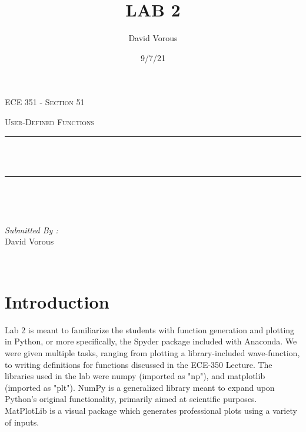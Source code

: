 \documentclass[12pt]{report}
\title{LAB 2}
\author{ David Vorous}
\date{9/7/21}
\makeatletter
\let\thetitle\@title
\makeatother
\begin{document}
\begin{titlepage}
	\centering
    \vspace*{0.5 cm}
\begin{center}    \textsc{\Large   ECE 351 - Section 51 }\\[2.0 cm]	\end{center}
	\textsc{\Large User-Defined Functions  }\\[0.5 cm]
	\rule{\linewidth}{0.2 mm} \\[0.4 cm]
	{ \huge \bfseries \thetitle}\\
	\rule{\linewidth}{0.2 mm} \\[1.5 cm]
	
	\begin{minipage}{0.4\textwidth}
		\begin{flushleft} \large
			\end{flushleft}
			\end{minipage}~
			\begin{minipage}{0.4\textwidth}
            
			\begin{flushright} \large
			\emph{Submitted By :} \\
			David Vorous  
		\end{flushright}
           
	\end{minipage}\\[2 cm]

\end{titlepage}


\tableofcontents

\pagebreak

\renewcommand{\thesection}{\arabic{section}}

\section{Introduction}
 
Lab 2 is meant to familiarize the students with function generation and plotting in Python, or more specifically, the Spyder package included with Anaconda. We were given multiple tasks, ranging from plotting a library-included wave-function, to writing definitions for functions discussed in the ECE-350 Lecture. The libraries used in the lab were numpy (imported as "np"), and matplotlib (imported as "plt"). NumPy is a generalized library meant to expand upon Python's original functionality, primarily aimed at scientific purposes. MatPlotLib is a visual package which generates professional plots using a variety of inputs.
\end{document}
